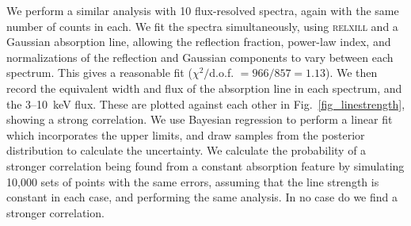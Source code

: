 \documentclass[10pt, a4paper]{article}
\begin{document}
We perform a similar analysis with 10 flux-resolved spectra, again with the same number of counts in each. We fit the spectra simultaneously, using \textsc{relxill} and a Gaussian absorption line, allowing the reflection fraction, power-law index, and normalizations of the reflection and Gaussian components to vary between each spectrum. This gives a reasonable fit ($\chi^2/$d.o.f. $=966/857=1.13$). We then record the equivalent width and flux of the absorption line in each spectrum, and the 3--10~keV flux. These are plotted against each other in Fig.~\ref{fig_linestrength}, showing a strong correlation. We use Bayesian regression to perform a linear fit which incorporates the upper limits, and draw samples from the posterior distribution to calculate the uncertainty. We calculate the probability of a stronger correlation being found from a constant absorption feature by simulating 10,000 sets of points with the same errors, assuming that the line strength is constant in each case, and performing the same analysis. In no case do we find a stronger correlation.
\end{document}

